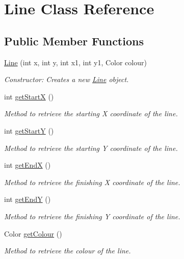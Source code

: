 \hypertarget{class_line}{}\section{Line Class Reference}
\label{class_line}
\subsection*{Public Member Functions}
\begin{DoxyCompactItemize}
\item 
\hyperlink{class_line_ad755514ead24f208bd7d7734a1e6aa59}{Line} (int x, int y, int x1, int y1, Color colour)
\begin{DoxyCompactList}\small\item\em Constructor\+: Creates a new \hyperlink{class_line}{Line} object. \end{DoxyCompactList}\item 
int \hyperlink{class_line_a1a555bf02c6b9f7df22558f0717aa651}{get\+StartX} ()
\begin{DoxyCompactList}\small\item\em Method to retrieve the starting X coordinate of the line. \end{DoxyCompactList}\item 
int \hyperlink{class_line_a41eea486d4123a77525ea3b9e95c60af}{get\+StartY} ()
\begin{DoxyCompactList}\small\item\em Method to retrieve the starting Y coordinate of the line. \end{DoxyCompactList}\item 
int \hyperlink{class_line_a7a5d82d47496f42297c77dc359d45e75}{get\+EndX} ()
\begin{DoxyCompactList}\small\item\em Method to retrieve the finishing X coordinate of the line. \end{DoxyCompactList}\item 
int \hyperlink{class_line_add8c48f0c1ee6de19e50dc463502a8ca}{get\+EndY} ()
\begin{DoxyCompactList}\small\item\em Method to retrieve the finishing Y coordinate of the line. \end{DoxyCompactList}\item 
Color \hyperlink{class_line_ab71501e12b598fe6d2adbf5a8a7928e0}{get\+Colour} ()
\begin{DoxyCompactList}\small\item\em Method to retrieve the colour of the line. \end{DoxyCompactList}\end{DoxyCompactItemize}


